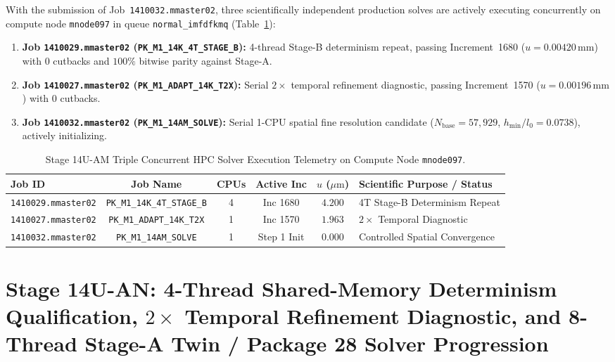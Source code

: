With the submission of Job~\texttt{1410032.mmaster02}, three scientifically independent production solves are actively executing concurrently on compute node \texttt{mnode097} in queue \texttt{normal\_imfdfkmq} (Table~\ref{tab:stage14uam_triple_telemetry}):
\begin{enumerate}
  \item \textbf{Job \texttt{1410029.mmaster02} (\texttt{PK\_M1\_14K\_4T\_STAGE\_B}):} 4-thread Stage-B determinism repeat, passing Increment~1680 ($u = 0.00420\,\mathrm{mm}$) with 0 cutbacks and $100\%$ bitwise parity against Stage-A.
  \item \textbf{Job \texttt{1410027.mmaster02} (\texttt{PK\_M1\_ADAPT\_14K\_T2X}):} Serial $2\times$ temporal refinement diagnostic, passing Increment~1570 ($u = 0.00196\,\mathrm{mm}$) with 0 cutbacks.
  \item \textbf{Job \texttt{1410032.mmaster02} (\texttt{PK\_M1\_14AM\_SOLVE}):} Serial 1-CPU spatial fine resolution candidate ($N_{\mathrm{base}} = 57,929$, $h_{\min}/l_0 = 0.0738$), actively initializing.
\end{enumerate}

\begin{table}[htbp]
\centering
\small
\caption{Stage 14U-AM Triple Concurrent HPC Solver Execution Telemetry on Compute Node \texttt{mnode097}.}
\label{tab:stage14uam_triple_telemetry}
\begin{tabularx}{\textwidth}{l c c c c X}
\toprule
\textbf{Job ID} & \textbf{Job Name} & \textbf{CPUs} & \textbf{Active Inc} & $u$ ($\mu\mathrm{m}$) & \textbf{Scientific Purpose / Status} \\
\midrule
\texttt{1410029.mmaster02} & \texttt{PK\_M1\_14K\_4T\_STAGE\_B} & 4 & Inc 1680 & $4.200$ & 4T Stage-B Determinism Repeat \\
\texttt{1410027.mmaster02} & \texttt{PK\_M1\_ADAPT\_14K\_T2X} & 1 & Inc 1570 & $1.963$ & $2\times$ Temporal Diagnostic \\
\texttt{1410032.mmaster02} & \texttt{PK\_M1\_14AM\_SOLVE} & 1 & Step 1 Init & $0.000$ & Controlled Spatial Convergence \\
\bottomrule
\end{tabularx}
\end{table}



\section{Stage 14U-AN: 4-Thread Shared-Memory Determinism Qualification, \texorpdfstring{$2\times$}{2x} Temporal Refinement Diagnostic, and 8-Thread Stage-A Twin / Package 28 Solver Progression}
\label{sec:stage14uan_determinism_temporal_progression}

